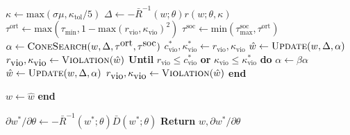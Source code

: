 \begin{algorithm}[H]
\begin{algorithmic}[1]
		\State \indent \hspace{-4mm} $\kappa \gets \mbox{max} (\sigma \mu, \kappa_{\mbox{tol}} / 5)$
		\State \indent \hspace{-4mm} $\Delta \gets  - \bar{R}^{-1}(w; \theta) r(w; \theta, \kappa)$
		\State \indent \hspace{-4mm} $\tau^{\mbox{ort}} \gets \mbox{max}(\tau_{\mbox{min}}, 1 - \mbox{max}(r_{\mbox{vio}}, \kappa_{\mbox{vio}})^2)$ 
		\State \indent \hspace{-4mm} $\tau^{\mbox{soc}} \gets \mbox{min}(\tau^{\mbox{soc}}_{\mbox{max}}, \tau^{\mbox{ort}})$ 
		\State \indent \hspace{-4mm} $\alpha \gets \Call{ConeSearch}{w, \Delta, \tau^{\mbox{ort}}, \tau^{\mbox{soc}}}$
		\State \indent \hspace{-4mm} $c^*_{\mbox{vio}}, \kappa^*_{\mbox{vio}} \gets r_{\mbox{vio}}, \kappa_{\mbox{vio}}$
		\State \indent \hspace{-4mm} \indent \hspace{-4mm} $\hat{w} \gets \Call{Update}{w, \Delta, \alpha}$ \Comment{(\ref{dojo_standard_update}, \ref{dojo_quaternion_update})}
		\State \indent \hspace{-4mm} \indent \hspace{-4mm} $r_{\mbox{vio}}, \kappa_{\mbox{vio}} \gets \Call{Violation}{\hat{w}}$ \Comment{(\ref{dojo_r_vio}, \ref{dojo_kappa_vio})}
		\State \indent \hspace{-4mm} \textbf{Until} $r_{\mbox{vio}} \leq c^*_{\mbox{vio}}$ \textbf{or} $\kappa_{\mbox{vio}} \leq \kappa^*_{\mbox{vio}}$ \textbf{do}
		\State \indent \hspace{-4mm} \indent \hspace{-4mm} $\alpha \leftarrow \beta \alpha$
		\State \indent \hspace{-4mm} \indent \hspace{-4mm} $\hat{w} \gets \Call{Update}{w, \Delta, \alpha}$ \Comment{(\ref{dojo_standard_update}, \ref{dojo_quaternion_update})}
		\State \indent \hspace{-4mm} \indent \hspace{-4mm} $r_{\mbox{vio}}, \kappa_{\mbox{vio}} \gets \Call{Violation}{\hat{w}}$ \Comment{(\ref{dojo_r_vio}, \ref{dojo_kappa_vio})}
		\State \indent \hspace{-4mm} \textbf{end}
		
		\State \indent \hspace{-4mm} $w \leftarrow \hat{w}$
		\State \textbf{end}
		
		\State $\partial w^* / \partial \theta \gets - \bar{R}^{-1}(w^*; \theta) \bar{D}(w^*; \theta)$ \Comment{(\ref{intro_solution_sensitivity})}
		\State \textbf{Return} $w, \partial w^* / \partial \theta$ 
		\EndProcedure
	\end{algorithmic}
\end{algorithm}

